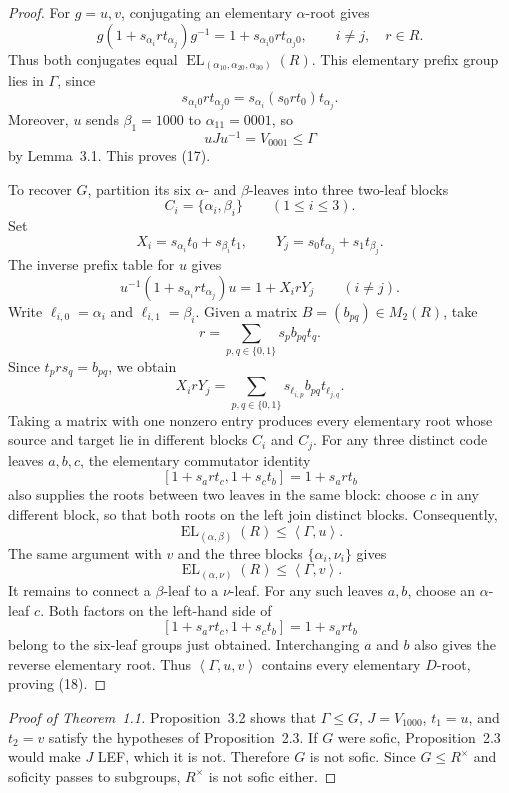 \documentclass[10pt]{article}
\newcommand{\EL}{\operatorname{EL}}
\newcommand{\angles}[1]{\left\langle #1\right\rangle}
\begin{document}
\begin{proof}
For $g=u,v$, conjugating an elementary $\alpha$-root gives
\[
g(1+s_{\alpha_i}rt_{\alpha_j})g^{-1}=1+s_{\alpha_i0}rt_{\alpha_j0},\qquad i\neq j,\quad r\in R.
\]
Thus both conjugates equal $\EL_{(\alpha_10,\alpha_20,\alpha_30)}(R)$. This elementary prefix group lies in $\Gamma$, since
\[
s_{\alpha_i0}rt_{\alpha_j0}=s_{\alpha_i}(s_0rt_0)t_{\alpha_j}.
\]
Moreover, $u$ sends $\beta_1=1000$ to $\alpha_11=0001$, so
\[
uJu^{-1}=V_{0001}\leq\Gamma
\]
by Lemma~3.1. This proves (17).

To recover $G$, partition its six $\alpha$- and $\beta$-leaves into three two-leaf blocks
\[
C_i=\{\alpha_i,\beta_i\}\qquad(1\leq i\leq3).
\]
Set
\[
X_i=s_{\alpha_i}t_0+s_{\beta_i}t_1,\qquad
Y_j=s_0t_{\alpha_j}+s_1t_{\beta_j}.
\]
The inverse prefix table for $u$ gives
\[
u^{-1}(1+s_{\alpha_i}rt_{\alpha_j})u=1+X_irY_j\qquad(i\neq j).
\]
Write $\ell_{i,0}=\alpha_i$ and $\ell_{i,1}=\beta_i$. Given a matrix $B=(b_{pq})\in M_2(R)$, take
\[
r=\sum_{p,q\in\{0,1\}}s_pb_{pq}t_q.
\]
Since $t_prs_q=b_{pq}$, we obtain
\[
X_irY_j=\sum_{p,q\in\{0,1\}}s_{\ell_{i,p}}b_{pq}t_{\ell_{j,q}}.
\]
Taking a matrix with one nonzero entry produces every elementary root whose source and target lie in different blocks $C_i$ and $C_j$. For any three distinct code leaves $a,b,c$, the elementary commutator identity
\[
[1+s_art_c,1+s_ct_b]=1+s_art_b
\]
also supplies the roots between two leaves in the same block: choose $c$ in any different block, so that both roots on the left join distinct blocks. Consequently,
\[
\EL_{(\alpha,\beta)}(R)\leq\angles{\Gamma,u}.
\]
The same argument with $v$ and the three blocks $\{\alpha_i,\nu_i\}$ gives
\[
\EL_{(\alpha,\nu)}(R)\leq\angles{\Gamma,v}.
\]
It remains to connect a $\beta$-leaf to a $\nu$-leaf. For any such leaves $a,b$, choose an $\alpha$-leaf $c$. Both factors on the left-hand side of
\[
[1+s_art_c,1+s_ct_b]=1+s_art_b
\]
belong to the six-leaf groups just obtained. Interchanging $a$ and $b$ also gives the reverse elementary root. Thus $\angles{\Gamma,u,v}$ contains every elementary $D$-root, proving (18).
\end{proof}

\begin{proof}[Proof of Theorem~1.1]
Proposition~3.2 shows that $\Gamma\leq G$, $J=V_{1000}$, $t_1=u$, and $t_2=v$ satisfy the hypotheses of Proposition~2.3. If $G$ were sofic, Proposition~2.3 would make $J$ LEF, which it is not. Therefore $G$ is not sofic. Since $G\leq R^\times$ and soficity passes to subgroups, $R^\times$ is not sofic either.
\end{proof}
\end{document}
